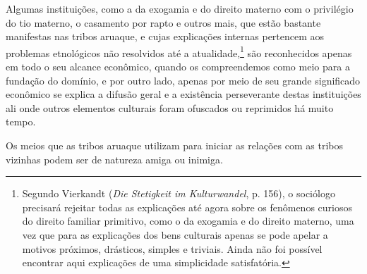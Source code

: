 Algumas instituições, como a da exogamia e do direito materno com o
privilégio do tio materno, o casamento por rapto e outros mais, que
estão bastante manifestas nas tribos aruaque, e cujas explicações
internas pertencem aos problemas etnológicos não resolvidos até a
atualidade,\footnote{Segundo Vierkandt (\emph{Die Stetigkeit im
  Kulturwandel}, p. 156), o sociólogo precisará rejeitar todas as
  explicações até agora sobre os fenômenos curiosos do direito familiar
  primitivo, como o da exogamia e do direito materno, uma vez que para
  as explicações dos bens culturais apenas se pode apelar a motivos
  próximos, drásticos, simples e triviais. Ainda não foi possível
  encontrar aqui explicações de uma simplicidade satisfatória.} são
reconhecidos apenas em todo o seu alcance econômico, quando os
compreendemos como meio para a fundação do domínio, e por outro lado,
apenas por meio de seu grande significado econômico se explica a difusão
geral e a existência perseverante destas instituições ali onde outros
elementos culturais foram ofuscados ou reprimidos há muito tempo.

Os meios que as tribos aruaque utilizam para iniciar as relações com as
tribos vizinhas podem ser de natureza amiga ou inimiga.

